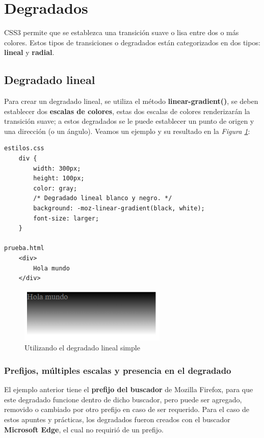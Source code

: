 \section{Degradados}

CSS3 permite que se establezca una transición suave o lisa entre dos o más colores. Estos tipos de transiciones o degradados están categorizados en dos tipos: \textbf{lineal} y \textbf{radial}.


\subsection{Degradado lineal}

Para crear un degradado lineal, se utiliza el método \textbf{linear-gradient()}, se deben establecer dos \textbf{escalas de colores}, estas dos escalas de colores renderizarán la transición suave; a estos degradados se le puede establecer un punto de origen y una dirección (o un ángulo). Veamos un ejemplo y su resultado en la \textit{Figura \ref{fig: 42}}:
\begin{lstlisting}
estilos.css
    div {
        width: 300px; 
        height: 100px;
        color: gray;  
        /* Degradado lineal blanco y negro. */
        background: -moz-linear-gradient(black, white);
        font-size: larger;
    }

prueba.html
    <div>
        Hola mundo
    </div>
\end{lstlisting}
\begin{figure}[H]
    \centering
    \caption{Utilizando el degradado lineal simple}
    \label{fig: 42}
    \includegraphics[width=7cm]{ss/linear-gradient-1.png}
\end{figure}


\subsubsection{Prefijos, múltiples escalas y presencia en el degradado}

El ejemplo anterior tiene el \textbf{prefijo del buscador} de Mozilla Firefox, para que este degradado funcione dentro de dicho buscador, pero puede ser agregado, removido o cambiado por otro prefijo en caso de ser requerido. Para el caso de estos apuntes y prácticas, los degradados fueron creados con el buscador \textbf{Microsoft Edge}, el cual no requirió de un prefijo.


